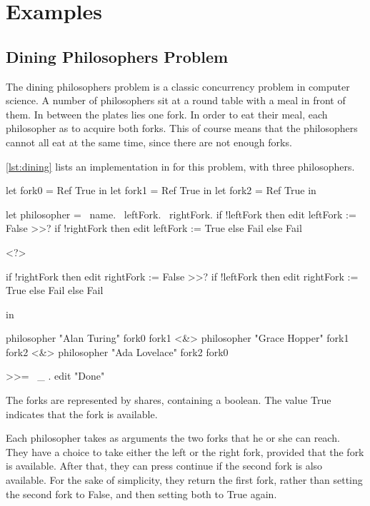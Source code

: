 
\section{Examples}
\label{sec:examples}

\subsection{Dining Philosophers Problem}

The dining philosophers problem is a classic concurrency problem in computer science.
A number of philosophers sit at a round table with a meal in front of them.
In between the plates lies one fork.
In order to eat their meal, each philosopher as to acquire both forks.
This of course means that the philosophers cannot all eat at the same time, since there are not enough forks.

\cref{lst:dining} lists an implementation in \TOPHAT for this problem, with three philosophers.
\begin{TASK}[float=ht
            ,numbers=right
            ,caption=Dining Philosophers Problem with three philosophers
            ,label=lst:dining
            ]
  let fork0 = Ref True in
  let fork1 = Ref True in
  let fork2 = Ref True in

  let philosopher = \ name. \ leftFork. \ rightFork.
          if !leftFork
             then edit leftFork := False >>? if !rightFork
                                          then edit leftFork := True
                                          else Fail
             else Fail

          <?>

          if !rightFork
             then edit rightFork := False >>? if !leftFork
                                          then edit rightFork := True
                                          else Fail
             else Fail

          in

    philosopher "Alan Turing" fork0 fork1 <&>
    philosopher "Grace Hopper" fork1 fork2 <&>
    philosopher "Ada Lovelace" fork2 fork0

    >>= \ _ . edit "Done"
\end{TASK}

The forks are represented by shares, containing a boolean.
The value True indicates that the fork is available.

Each philosopher takes as arguments the two forks that he or she can reach.
They have a choice to take either the left or the right fork, provided that the fork is available.
After that, they can press continue if the second fork is also available.
For the sake of simplicity, they return the first fork, rather than setting the second fork to False, and then setting both to True again.


